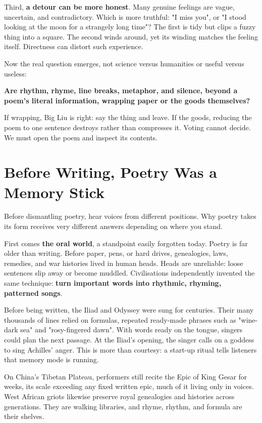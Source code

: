Third, \textbf{a detour can be more honest}. Many genuine feelings are vague, uncertain, and contradictory. Which is more truthful: "I miss you", or "I stood looking at the moon for a strangely long time"? The first is tidy but clips a fuzzy thing into a square. The second winds around, yet its winding matches the feeling itself. Directness can distort such experience.

Now the real question emerges, not science versus humanities or useful versus useless:

\textbf{Are rhythm, rhyme, line breaks, metaphor, and silence, beyond a poem's literal information, wrapping paper or the goods themselves?}

If wrapping, Big Liu is right: say the thing and leave. If the goods, reducing the poem to one sentence destroys rather than compresses it. Voting cannot decide. We must open the poem and inspect its contents.

\section{Before Writing, Poetry Was a Memory Stick}
Before dismantling poetry, hear voices from different positions. Why poetry takes its form receives very different answers depending on where you stand.

First comes \textbf{the oral world}, a standpoint easily forgotten today. Poetry is far older than writing. Before paper, pens, or hard drives, genealogies, laws, remedies, and war histories lived in human heads. Heads are unreliable: loose sentences slip away or become muddled. Civilisations independently invented the same technique: \textbf{turn important words into rhythmic, rhyming, patterned songs}.

Before being written, the Iliad and Odyssey were sung for centuries. Their many thousands of lines relied on formulas, repeated ready-made phrases such as "wine-dark sea" and "rosy-fingered dawn". With words ready on the tongue, singers could plan the next passage. At the Iliad's opening, the singer calls on a goddess to sing Achilles' anger. This is more than courtesy: a start-up ritual tells listeners that memory mode is running.

On China's Tibetan Plateau, performers still recite the Epic of King Gesar for weeks, its scale exceeding any fixed written epic, much of it living only in voices. West African griots likewise preserve royal genealogies and histories across generations. They are walking libraries, and rhyme, rhythm, and formula are their shelves.

